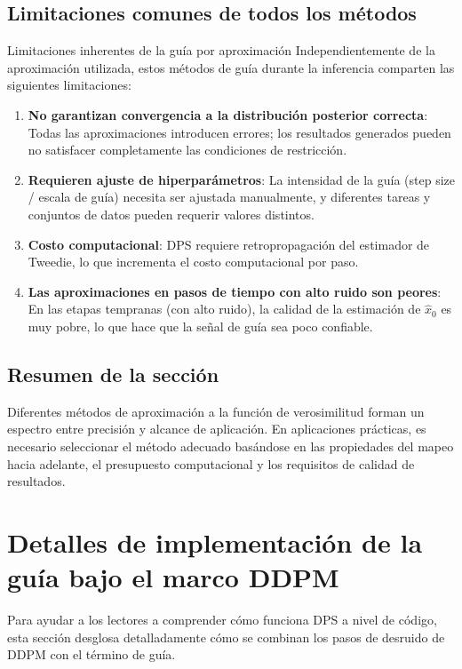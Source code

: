 \documentclass[a4paper]{article}
\begin{document}
\subsection{Limitaciones comunes de todos los métodos}

\begin{warningbox}{Limitaciones inherentes de la guía por aproximación}
Independientemente de la aproximación utilizada, estos métodos de guía durante la inferencia comparten las siguientes limitaciones:
\begin{enumerate}
    \item \textbf{No garantizan convergencia a la distribución posterior correcta}: Todas las aproximaciones introducen errores; los resultados generados pueden no satisfacer completamente las condiciones de restricción.
    \item \textbf{Requieren ajuste de hiperparámetros}: La intensidad de la guía (step size / escala de guía) necesita ser ajustada manualmente, y diferentes tareas y conjuntos de datos pueden requerir valores distintos.
    \item \textbf{Costo computacional}: DPS requiere retropropagación del estimador de Tweedie, lo que incrementa el costo computacional por paso.
    \item \textbf{Las aproximaciones en pasos de tiempo con alto ruido son peores}: En las etapas tempranas (con alto ruido), la calidad de la estimación de $\hat{x}_0$ es muy pobre, lo que hace que la señal de guía sea poco confiable.
\end{enumerate}
\end{warningbox}

\subsection{Resumen de la sección}

Diferentes métodos de aproximación a la función de verosimilitud forman un espectro entre precisión y alcance de aplicación. En aplicaciones prácticas, es necesario seleccionar el método adecuado basándose en las propiedades del mapeo hacia adelante, el presupuesto computacional y los requisitos de calidad de resultados.


\section{Detalles de implementación de la guía bajo el marco DDPM}

Para ayudar a los lectores a comprender cómo funciona DPS a nivel de código, esta sección desglosa detalladamente cómo se combinan los pasos de desruido de DDPM con el término de guía.
\end{document}
